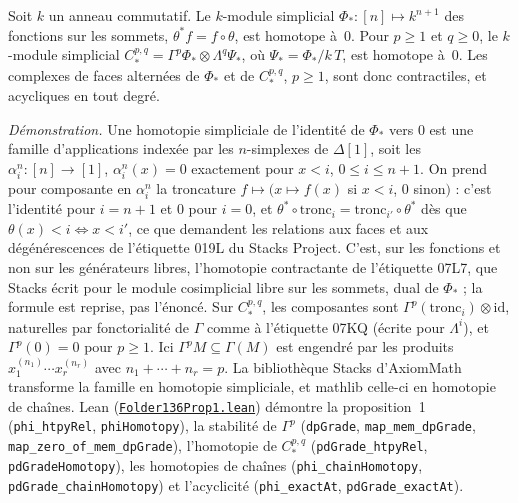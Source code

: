 \begin{encadre}
\begin{theoreme*}
Soit $k$ un anneau commutatif. Le $k$-module simplicial $\Phi_* : [n] \mapsto k^{n+1}$ des fonctions sur les sommets, $\theta^* f = f \circ \theta$, est homotope à~$0$. Pour $p \geq 1$ et $q \geq 0$, le $k$-module simplicial $C^{p,q}_* = \Gamma^p\Phi_* \otimes \Lambda^q\Psi_*$, où $\Psi_* = \Phi_*/k\,T$, est homotope à~$0$. Les complexes de faces alternées de $\Phi_*$ et de $C^{p,q}_*$, $p \geq 1$, sont donc contractiles, et acycliques en tout degré.
\end{theoreme*}
\end{encadre}
{\small \emph{Démonstration.} Une homotopie simpliciale de l'identité de $\Phi_*$ vers $0$ est une famille d'applications indexée par les $n$-simplexes de $\Delta[1]$, soit les $\alpha^n_i : [n] \to [1]$, $\alpha^n_i(x) = 0$ exactement pour $x < i$, $0 \leq i \leq n+1$. On prend pour composante en $\alpha^n_i$ la troncature $f \mapsto (x \mapsto f(x)$ si $x < i$, $0$ sinon$)$ : c'est l'identité pour $i = n+1$ et $0$ pour $i = 0$, et $\theta^* \circ \mathrm{tronc}_i = \mathrm{tronc}_{i'} \circ \theta^*$ dès que $\theta(x) < i \Leftrightarrow x < i'$, ce que demandent les relations aux faces et aux dégénérescences de l'étiquette 019L du Stacks Project. C'est, sur les fonctions et non sur les générateurs libres, l'homotopie contractante de l'étiquette 07L7, que Stacks écrit pour le module cosimplicial libre sur les sommets, dual de $\Phi_*$ ; la formule est reprise, pas l'énoncé. Sur $C^{p,q}_*$, les composantes sont $\Gamma^p(\mathrm{tronc}_i) \otimes \mathrm{id}$, naturelles par fonctorialité de $\Gamma$ comme à l'étiquette 07KQ (écrite pour $\Lambda^i$), et $\Gamma^p(0) = 0$ pour $p \geq 1$. Ici $\Gamma^p M \subseteq \Gamma(M)$ est engendré par les produits $x_1^{(n_1)} \cdots x_r^{(n_r)}$ avec $n_1 + \cdots + n_r = p$. La bibliothèque Stacks d'AxiomMath \cite{axiomstacks} transforme la famille en homotopie simpliciale, et mathlib celle-ci en homotopie de chaînes. Lean (\href{\leanblobmain/RingTheory/Folder136Prop1.lean}{\texttt{Folder136Prop1.\allowbreak{}lean}}) démontre la proposition~1 (\texttt{phi\_htpyRel}, \texttt{phiHomotopy}), la stabilité de $\Gamma^p$ (\texttt{dpGrade}, \texttt{map\_mem\_dpGrade}, \texttt{map\_zero\_of\_mem\_dpGrade}), l'homotopie de $C^{p,q}_*$ (\texttt{pdGrade\_htpyRel}, \texttt{pdGradeHomotopy}), les homotopies de chaînes (\texttt{phi\_chainHomotopy}, \texttt{pdGrade\_chainHomotopy}) et l'acyclicité (\texttt{phi\_exactAt}, \texttt{pdGrade\_exactAt}).\par}
